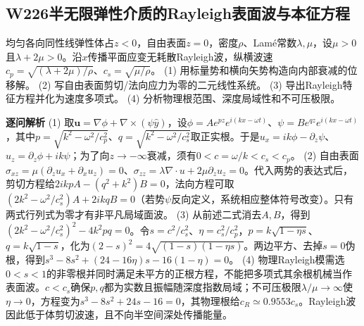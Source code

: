 \subsection*{W226\quad 半无限弹性介质的Rayleigh表面波与本征方程}
均匀各向同性线弹性体占$z<0$，自由表面$z=0$，密度$\rho$、Lamé常数$\lambda,\mu$，设$\mu>0$且$\lambda+2\mu>0$。沿$x$传播平面应变无耗散Rayleigh波，纵横波速$c_p=\sqrt{(\lambda+2\mu)/\rho}$、$c_s=\sqrt{\mu/\rho}$。
(1) 用标量势和横向矢势构造向内部衰减的位移解。
(2) 写自由表面剪切/法向应力为零的二元线性系统。
(3) 导出Rayleigh特征方程并化为速度多项式。
(4) 分析物理根范围、深度局域性和不可压极限。
\par\textbf{逐问解析}
(1) 取$\boldsymbol u=\nabla\phi+\nabla\times(\psi\hat y)$，设$\phi=Ae^{pz}e^{i(kx-\omega t)}$、$\psi=Be^{qz}e^{i(kx-\omega t)}$，其中$p=\sqrt{k^2-\omega^2/c_p^2}$、$q=\sqrt{k^2-\omega^2/c_s^2}$取正实根。于是$u_x=ik\phi-\partial_z\psi$、$u_z=\partial_z\phi+ik\psi$；为了向$z\to-\infty$衰减，须有$0<c=\omega/k<c_s<c_p$。
(2) 自由表面$\sigma_{xz}=\mu(\partial_zu_x+\partial_xu_z)=0$、$\sigma_{zz}=\lambda\nabla\cdot u+2\mu\partial_zu_z=0$。代入两势的表达式后，剪切方程给$2ikpA-(q^2+k^2)B=0$，法向方程可取$(2k^2-\omega^2/c_s^2)A+2ikqB=0$（若势$\psi$反向定义，系统相应整体符号改变）。只有两式行列式为零才有非平凡局域面波。
(3) 从前述二式消去$A,B$，得到$(2k^2-\omega^2/c_s^2)^2-4k^2pq=0$。令$s=c^2/c_s^2$、$\eta=c_s^2/c_p^2$，$p=k\sqrt{1-\eta s}$、$q=k\sqrt{1-s}$，化为$(2-s)^2=4\sqrt{(1-s)(1-\eta s)}$。两边平方、去掉$s=0$伪根，得到$s^3-8s^2+(24-16\eta)s-16(1-\eta)=0$。
(4) 物理Rayleigh模需选$0<s<1$的非零根并同时满足未平方的正根方程，不能把多项式其余根机械当作表面波。$c<c_s$确保$p,q$都为实数且振幅随深度指数局域；不可压极限$\lambda/\mu\to\infty$使$\eta\to0$，方程变为$s^3-8s^2+24s-16=0$，其物理根给$c_R\simeq0.9553c_s$。Rayleigh波因此低于体剪切波速，且不向半空间深处传播能量。
\par\medskip
